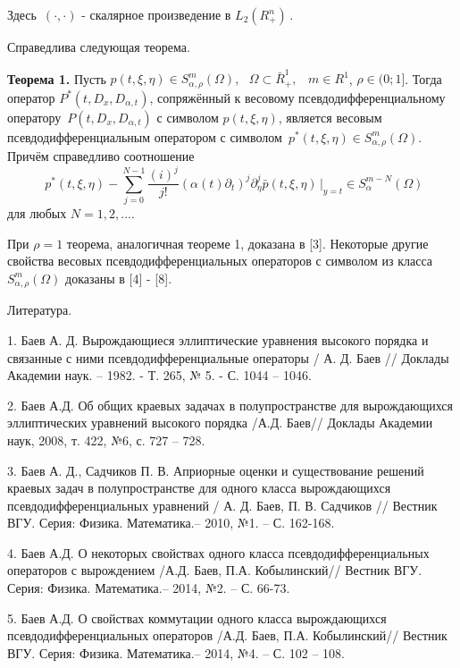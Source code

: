 {Здесь $\,( \cdot , \cdot )$ - скалярное произведение в $L_2 (R_ + ^n )\,$.

Справедлива следующая теорема.

\textbf{Теорема 1.} Пусть $p(t,\xi ,\eta ) \in S_{\alpha ,\rho }^m (\Omega
),\,\,\,\,\Omega \subset \bar {R}_ + ^1 ,\,\,\,\,\,m \in R^1$, $\rho \in
(0;1]$. Тогда оператор $P^\ast (t,D_x ,D_{\alpha ,t} )$, сопряжённый к
весовому псевдодифференциальному оператору $\,P(t,D_x ,D_{\alpha ,t} )$ с
символом $p(t,\xi ,\eta )$, является весовым псевдодифференциальным
оператором с символом $\,p^\ast (t,\xi ,\eta ) \in S_{\alpha ,\rho }^m
(\Omega )$. Причём справедливо соотношение
\[
\,\,p^\ast (t,\xi ,\eta ) - \sum\limits_{j = 0}^{N - 1} {\frac{(i)^j}{j!}}
(\alpha (t)\partial _t )^j\partial _\eta ^j \left. {\bar {p}(t,\xi ,\eta
)\,} \right|_{y = t} \in S_\alpha ^{m - N} (\Omega )
\]
для любых $N = 1,2,...$.



При $\rho = 1$ теорема, аналогичная теореме 1, доказана в [3]. Некоторые
другие свойства весовых псевдодифференциальных операторов с символом из
класса $S_{\alpha ,\rho }^m (\Omega )$ доказаны в [4] - [8].

\begin{center}
Литература.
\end{center}

1. Баев А. Д. Вырождающиеся эллиптические уравнения высокого порядка и
связанные с ними псевдодифференциальные операторы / А. Д. Баев // Доклады
Академии наук. -- 1982. - Т. 265, № 5. - С. 1044 -- 1046.

2. Баев А.Д. Об общих краевых задачах в полупространстве для вырождающихся
эллиптических уравнений высокого порядка /А.Д. Баев// Доклады Академии наук,
2008, т. 422, №6, с. 727 -- 728.

3. Баев А. Д., Садчиков П. В. Априорные оценки и существование решений
краевых задач в полупространстве для одного класса вырождающихся
псевдодифференциальных уравнений / А. Д. Баев, П. В. Садчиков // Вестник
ВГУ. Серия: Физика. Математика.-- 2010, №1. -- С. 162-168.

4. Баев А.Д. О некоторых свойствах одного класса псевдодифференциальных
операторов с вырождением /А.Д. Баев, П.А. Кобылинский// Вестник ВГУ. Серия:
Физика. Математика.-- 2014, №2. -- С. 66-73.

5. Баев А.Д. О свойствах коммутации одного класса вырождающихся
псевдодифференциальных операторов /А.Д. Баев, П.А. Кобылинский// Вестник
ВГУ. Серия: Физика. Математика.-- 2014, №4. -- С. 102 -- 108.

}
